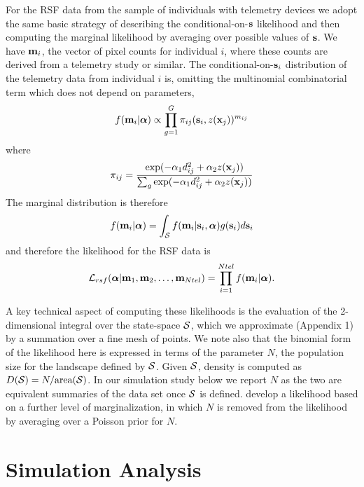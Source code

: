 \documentclass[12pt]{article}
\begin{document}
For the RSF data from the sample of individuals with telemetry devices
we adopt the same basic strategy of describing the
conditional-on-${\bf s}$ likelihood and then computing the marginal
likelihood by averaging over possible values of ${\bf s}$.
We have ${\bf m}_{i}$, the vector of pixel counts for individual $i$,
where these counts are derived from a telemetry study or similar.
The conditional-on-${\bf s}_{i}$ distribution of the telemetry data
from individual $i$ is, omitting the multinomial combinatorial term which does not
depend on parameters,
\[
 f({\bf m}_{i}  | {\bm \alpha} ) \propto
\prod_{g=1}^{G}  \pi_{ij}({\bf s}_{i},z({\bf x}_{j})) ^{m_{ij}}
\]
where
\[
 \pi_{ij}  = \frac{ \exp( -\alpha_{1} d_{ij}^{2} +\alpha_{2} z({\bf x}_{j}) ) }
{ \sum_{g} \exp(-\alpha_{1} d_{ij}^{2} +\alpha_{2} z({\bf x}_{j}))}
\]
The marginal distribution is therefore
\[
f({\bf m}_{i}|{\bm \alpha}) =    \int_{{\cal S}}  f({\bf m}_{i} |{\bf s}_{i},{\bm \alpha}) g({\bf s}_{i}) d{\bf s}_{i}
\]
and therefore the likelihood for the RSF data is
\[
{\cal L}_{rsf}({\bm \alpha} | {\bf m}_{1},{\bf m}_{2},\ldots, {\bf m}_{Ntel}) = \prod_{i=1}^{Ntel}
f({\bf m}_{i}|{\bm \alpha}).
\]

A key technical aspect of computing these likelihoods is the
evaluation of the 2-dimensional integral over the state-space ${\cal
  S}$, which we approximate (Appendix 1) by a
summation over a fine mesh of points.
We note also that the binomial form of the likelihood here is
expressed in terms of the parameter
$N$, the population size for the landscape defined by ${\cal
  S}$. Given ${\cal S}$, density is computed as $D({\cal S}) =
N/\mbox{area}({\cal S})$. In our simulation study below we report $N$ as the
two are equivalent summaries of the data set once ${\cal S}$ is
defined. \citet{borchers_efford:2008} develop a likelihood based on a
further level of marginalization, in which $N$ is removed from the
likelihood by averaging over a  Poisson prior for $N$.


\section{Simulation Analysis}
\end{document}
